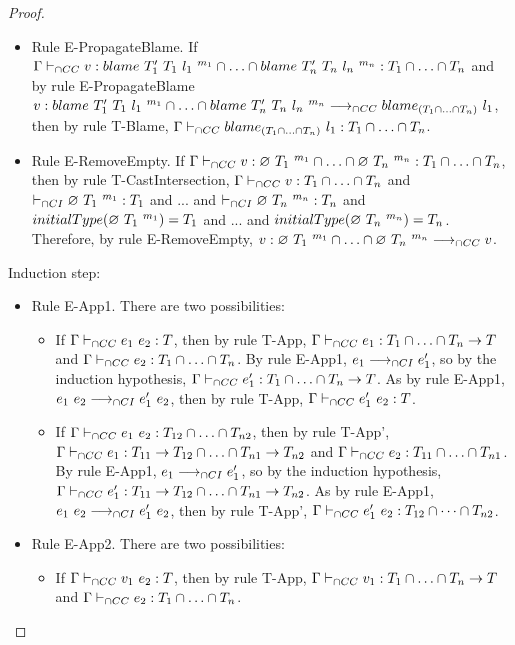 \documentclass[a4paper]{article}
\begin{document}
\begin{proof}
\begin{itemize}
    \item Rule E-PropagateBlame.
    If $\Gamma \vdash_{\cap CC} v : blame\ T_1'\ T_1\ l_1\ ^{m_1} \cap \ldots \cap blame\ T_n'\ T_n\ l_n\ ^{m_n} : T_1 \cap \ldots \cap T_n$ and by rule E-PropagateBlame $v : blame\ T_1'\ T_1\ l_1\ ^{m_1} \cap \ldots \cap blame\ T_n'\ T_n\ l_n\ ^{m_n} \longrightarrow_{\cap CC} blame_{(T_1 \cap \ldots \cap T_n)}\ l_1$, then by rule T-Blame, $\Gamma \vdash_{\cap CC} blame_{(T_1 \cap \ldots \cap T_n)}\ l_1 : T_1 \cap \ldots \cap T_n$.
    \item Rule E-RemoveEmpty.
    If $\Gamma \vdash_{\cap CC} v : \varnothing\ T_1\ ^{m_1} \cap \ldots \cap \varnothing\ T_n\ ^{m_n} : T_1 \cap \ldots \cap T_n$, then by rule T-CastIntersection, $\Gamma \vdash_{\cap CC} v : T_1 \cap \ldots \cap T_n$ and $\vdash_{\cap CI} \varnothing\ T_1\ ^{m_1} : T_1$ and ... and $\vdash_{\cap CI} \varnothing\ T_n\ ^{m_n} : T_n$ and $initialType(\varnothing\ T_1\ ^{m_1}) = T_1$ and ... and $initialType(\varnothing\ T_n\ ^{m_n}) = T_n$.
    Therefore, by rule E-RemoveEmpty, $v : \varnothing\ T_1\ ^{m_1} \cap \ldots \cap \varnothing\ T_n\ ^{m_n} \longrightarrow_{\cap CC} v$.
\end{itemize}
Induction step:
\begin{itemize}
    \item Rule E-App1. There are two possibilities:
    \begin{itemize}
        \item If $\Gamma \vdash_{\cap CC} e_1\ e_2 : T$, then by rule T-App, $\Gamma \vdash_{\cap CC} e_1 : T_1 \cap \ldots \cap T_n \rightarrow T$ and $\Gamma \vdash_{\cap CC} e_2 : T_1 \cap \ldots \cap T_n$.
        By rule E-App1, $e_1 \longrightarrow_{\cap CI} e_1'$, so by the induction hypothesis, $\Gamma \vdash_{\cap CC} e_1' : T_1 \cap \ldots \cap T_n \rightarrow T$.
        As by rule E-App1, $e_1\ e_2 \longrightarrow_{\cap CI} e_1'\ e_2$, then by rule T-App, $\Gamma \vdash_{\cap CC} e_1'\ e_2 : T$.
        \item If $\Gamma \vdash_{\cap CC} e_1\ e_2 : T_{12} \cap \ldots \cap T_{n2}$, then by rule T-App', $\Gamma \vdash_{\cap CC} e_1 : T_{11} \rightarrow T_{12} \cap \ldots \cap T_{n1} \rightarrow T_{n2}$ and $\Gamma \vdash_{\cap CC} e_2 : T_{11} \cap \ldots \cap T_{n1}$.
        By rule E-App1, $e_1 \longrightarrow_{\cap CI} e_1'$, so by the induction hypothesis, $\Gamma \vdash_{\cap CC} e_1' : T_{11} \rightarrow T_{12} \cap \ldots \cap T_{n1} \rightarrow T_{n2}$.
        As by rule E-App1, $e_1\ e_2 \longrightarrow_{\cap CI} e_1'\ e_2$, then by rule T-App', $\Gamma \vdash_{\cap CC} e_1'\ e_2 : T_{12} \cap \dots \cap T_{n2}$.
    \end{itemize}
    \item Rule E-App2. There are two possibilities:
    \begin{itemize}
        \item If $\Gamma \vdash_{\cap CC} v_1\ e_2 : T$, then by rule T-App, $\Gamma \vdash_{\cap CC} v_1 : T_1 \cap \ldots \cap T_n \rightarrow T$ and $\Gamma \vdash_{\cap CC} e_2 : T_1 \cap \ldots \cap T_n$.

\end{itemize}
\end{itemize}
\end{proof}
\end{document}
